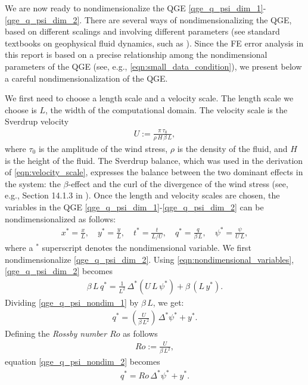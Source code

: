 We are now ready to nondimensionalize the QGE
\eqref{qge_q_psi_dim_1}-\eqref{qge_q_psi_dim_2}.  There are several ways of
nondimensionalizing the QGE, based on different scalings and involving different
parameters (see standard textbooks on geophysical fluid dynamics, such as
\cite{Cushman11,Majda,Pedlosky92,Vallis06}).  Since the FE error analysis in
this report is based on a precise relationship among the nondimensional
parameters of the QGE (see, e.g., \eqref{eqn:small_data_condition}), we present
below a careful nondimensionalization of the QGE.

We first need to choose a length scale and a velocity scale. The length scale we
choose is $L$, the width of the computational domain. The velocity scale is the
Sverdrup velocity
\begin{align}
  U := \frac{\pi \, \tau_0}{\rho \, H \, \beta \, L} ,
  \label{eqn:velocity_scale}
\end{align}
where $\tau_0$ is the amplitude of the wind stress, $\rho$ is the density of the
fluid, and $H$ is the height of the fluid. The Sverdrup balance, which was used
in the derivation of \eqref{eqn:velocity_scale}, expresses the balance between
the two dominant effects in the system: the $\beta$-effect and the curl of the
divergence of the wind stress (see, e.g., Section 14.1.3 in \cite{Vallis06}).
Once the length and velocity scales are chosen, the variables in the QGE
\eqref{qge_q_psi_dim_1}-\eqref{qge_q_psi_dim_2} can be nondimensionalized as
follows:
\begin{align}
  x^* = \frac{x}{L}, \quad
  y^* = \frac{y}{L}, \quad
  t^* = \frac{t}{L / U}, \quad
  q^* = \frac{q}{\beta \, L}, \quad
  \psi^* = \frac{\psi}{U \, L} ,
\label{eqn:nondimensional_variables}
\end{align}
where a $^*$ superscript denotes the nondimensional variable. We first
nondimensionalize \eqref{qge_q_psi_dim_2}. Using
\eqref{eqn:nondimensional_variables}, \eqref{qge_q_psi_dim_2} becomes
\begin{align}
  \beta \, L \, q^* = \frac{1}{L^2} \, \Delta^* (U \, L \, \psi^*) + \beta \, (L \, y^*) .
  \label{qge_q_psi_nondim_1}
\end{align}
Dividing \eqref{qge_q_psi_nondim_1} by $\beta \, L$, we get:
\begin{align}
  q^* = \left( \frac{U}{\beta \, L^2} \right) \, \Delta^* \psi^* + y^* .
  \label{qge_q_psi_nondim_2}
\end{align}
Defining the \emph{Rossby number $Ro$} as follows
\begin{align}
  Ro := \frac{U}{\beta \, L^2} , \label{eqn:rossby_number}
\end{align}
equation \eqref{qge_q_psi_nondim_2} becomes
\begin{align}
  q^* = Ro \, \Delta^* \psi^* + y^* .
  \label{qge_q_psi_nondim_3}
\end{align}

